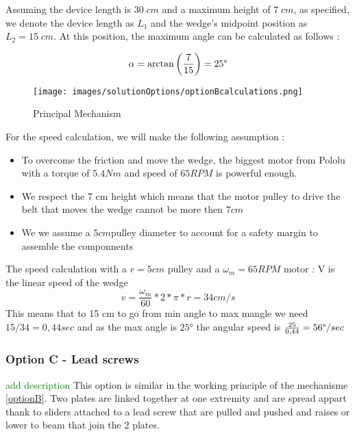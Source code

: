 \documentclass[lettersize,journal]{IEEEtran}
\begin{document}
Assuming the device length is $30 \;cm$ and a maximum height of $7 \;cm$, as specified, we denote the device length as $L_1$ and the wedge's midpoint position as $L_2 = 15\;cm$. At this position, the maximum angle can be calculated as follows :

\begin{equation*}
    \alpha = \arctan \left( \frac{7}{15} \right) = 25 \degree
\end{equation*}

\begin{figure}[ht]
    \centering
    \texttt{[image: images/solutionOptions/optionBcalculations.png]}
    \caption{Principal Mechanism}
    \label{wedge mecanism}
\end{figure}



For the speed calculation, we will make the following assumption : 
\begin{itemize}
    \item To overcome the friction and move the wedge, the biggest motor from Pololu \cite{pololu} with a torque of $5.4 Nm $ and speed of $65RPM$ is powerful enough. 
    \item We respect the 7 cm height which means that the motor pulley to drive the belt that moves the wedge cannot be more then $7cm$ 
    \item We we assume a $5cm $pulley diameter to account for a safety margin to assemble the componnents
\end{itemize}
The speed calculation with a $r = 5cm$ pulley and a $\omega_m = 65 RPM$ motor :
V is the linear speed of the wedge
\begin{equation*}
    v = \frac{\omega_m}{60}*2*\pi*r = 34 cm/s
\end{equation*}
This means that to 15 cm to go from min angle to max mangle we need $15/34 = 0,44 sec$ and as the max angle is $25°$ the angular speed is $\frac{25}{0,44} = 56 \degree / sec$



\medskip \subsubsection{Option C - Lead screws }
\textcolor{green}{ add description}
This option is similar in the working principle of the mechanisme \ref{optionB}. Two plates are linked together at one extremity and are spread appart thank to sliders attached to a lead screw that are pulled and pushed and raises or lower to beam that join the 2 plates. 
\end{document}
